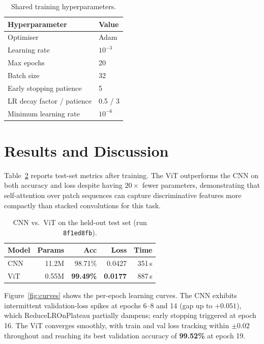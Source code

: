 \begin{table}[H]
\centering
\caption{Shared training hyperparameters.}
\label{tab:hp}
\begin{tabular}{@{}ll@{}}
\toprule
\textbf{Hyperparameter}   & \textbf{Value} \\
\midrule
Optimiser                 & Adam \\
Learning rate             & $10^{-3}$ \\
Max epochs                & 20 \\
Batch size                & 32 \\
Early stopping patience   & 5 \\
LR decay factor / patience & 0.5 / 3 \\
Minimum learning rate     & $10^{-6}$ \\
\bottomrule
\end{tabular}
\end{table}

\section{Results and Discussion}

Table~\ref{tab:results} reports test-set metrics after training. The ViT
outperforms the CNN on both accuracy and loss despite having $20\times$ fewer
parameters, demonstrating that self-attention over patch sequences can capture
discriminative features more compactly than stacked convolutions for this task.

\begin{table}[H]
\centering
\caption{CNN vs.\ ViT on the held-out test set (run \texttt{8f1ed8fb}).}
\label{tab:results}
\begin{tabular}{@{}lrrrr@{}}
\toprule
\textbf{Model} & \textbf{Params} & \textbf{Acc} & \textbf{Loss} & \textbf{Time} \\
\midrule
CNN & 11.2M & 98.71\% & 0.0427 & 351\,s \\
ViT & 0.55M & \textbf{99.49\%} & \textbf{0.0177} & 887\,s \\
\bottomrule
\end{tabular}
\end{table}

Figure~\ref{fig:curves} shows the per-epoch learning curves. The CNN exhibits
intermittent validation-loss spikes at epochs 6--8 and 14 (gap up to $+0.051$),
which ReduceLROnPlateau partially dampens; early stopping triggered at epoch 16.
The ViT converges smoothly, with train and val loss tracking within $\pm0.02$
throughout and reaching its best validation accuracy of \textbf{99.52\%} at
epoch 19.

